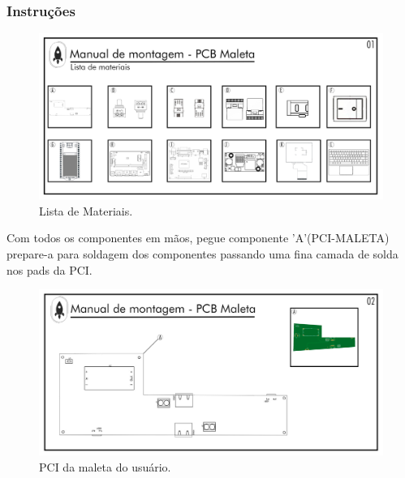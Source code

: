 \subsubsection{Instruções}

\begin{figure}[H]
  \centering
  \includegraphics[width=\textwidth]{Figuras/MALETA/Pg-01---PL-01.png}
  \caption{Lista de Materiais.} 
  \label{fig:Lista de materiais MALETA1}
\end{figure}


 \par Com todos os componentes em mãos, pegue componente 'A'(PCI-MALETA) prepare-a para soldagem dos componentes passando uma fina camada de solda nos pads da PCI.

\begin{figure}[H]
  \centering
  \includegraphics[width=\textwidth]{Figuras/MALETA/Pg-02---PL-01.png}
  \caption{PCI da maleta do usuário.}
  \label{fig:Lista de materiasi MALETA}
\end{figure}
\newpage

